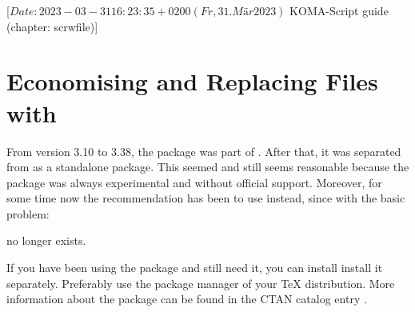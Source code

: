 %
%
%
%
%
%
%

%
                 [$Date: 2023-03-31 16:23:35 +0200 (Fr, 31. Mär 2023) $
                  KOMA-Script guide (chapter: scrwfile)]


\chapter{Economising and Replacing Files with }
\BeginIndexGroup
{}

From version 3.10 to 3.38, the package
\href{https://www.ctan.org/pkg/scrwfile}{} was part of
\KOMAScript. After that, it was separated from \KOMAScript{} as a standalone
package. This seemed and still seems reasonable because the package was always
experimental and without official support. Moreover, for some time now the
recommendation has been to use \LuaLaTeX{} instead, since with \LuaLaTeX{} the
basic problem:
no longer exists.

If you have been using the package and still need it, you can install install
it separately. Preferably use the package manager of your \TeX{}
distribution. More information about the package can be found in the CTAN
catalog entry \cite{package:scrwfile}.%
\EndIndexGroup

